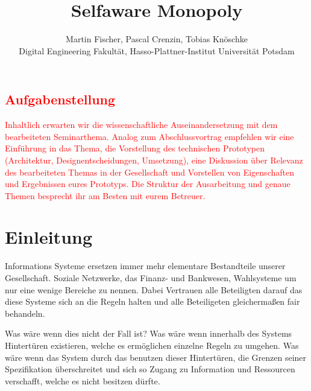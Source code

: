 \documentclass[german]{cgspaper} %
\title{Selfaware Monopoly}
\author{Martin Fischer, Pascal Crenzin, Tobias Knöschke\\ Digital Engineering Fakultät, Hasso-Plattner-Institut \textbar{} Universität Potsdam}
\begin{document}

\maketitle

\begin{abstract}
\end{abstract}

\copyrightspace %

\textcolor{red}{
\section{Aufgabenstellung}
Inhaltlich erwarten wir die wissenschaftliche Auseinandersetzung mit dem bearbeiteten Seminarthema. Analog zum Abschlussvortrag empfehlen wir eine Einführung in das Thema, die Vorstellung des technischen Prototypen (Architektur, Designentscheidungen, Umsetzung), eine Diskussion über Relevanz des bearbeiteten Themas in der Gesellschaft und Vorstellen von Eigenschaften und Ergebnissen eures Prototyps. Die Struktur der Ausarbeitung und genaue Themen besprecht ihr am Besten mit eurem Betreuer.
}
\section{Einleitung}

Informations Systeme ersetzen immer mehr elementare Bestandteile unserer Gesellschaft.
Soziale Netzwerke, das Finanz- und Bankwesen, Wahlsysteme um nur eine wenige Bereiche zu nennen.
Dabei Vertrauen alle Beteiligten darauf das diese Systeme sich an die Regeln halten und alle Beteiligeten gleichermaßen fair behandeln.

Was wäre wenn dies nicht der Fall ist? 
Was wäre wenn innerhalb des Systems Hintertüren existieren, welche es ermöglichen einzelne Regeln zu umgehen.
Was wäre wenn das System durch das benutzen dieser Hintertüren, die Grenzen seiner Spezifikation überschreitet und sich so Zugang zu Information und Ressourcen verschafft, welche es nicht besitzen dürfte.
\end{document}
